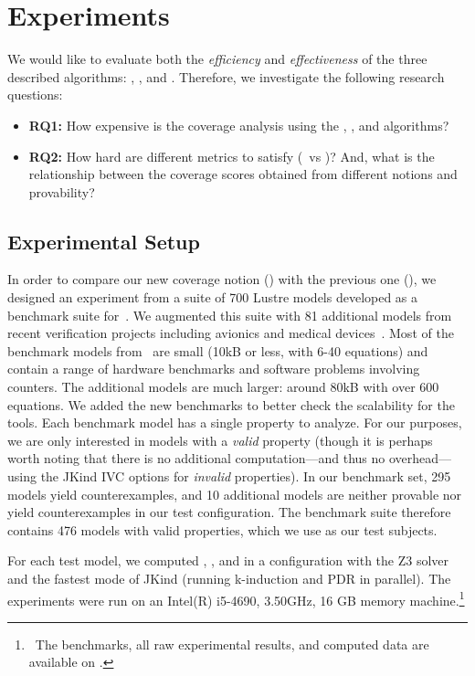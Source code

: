 \section{Experiments}
\label{sec:experiments}

We would like to evaluate both the {\em efficiency} and {\em
  effectiveness} of the three described algorithms: \ucbfalg, \ucalg, and \mustalg. Therefore, we investigate the following research questions:
\begin{itemize}
    \item \textbf{RQ1:} How expensive is the coverage analysis using the \ucalg, \mustalg, and \ucbfalg algorithms?
    \item \textbf{RQ2:} How hard are different metrics to satisfy (\ivccov\ vs \nondetcovalt)?  And, what is the relationship between the coverage scores obtained from different notions and provability?
\end{itemize}

\subsection{Experimental Setup}

In order to compare our new coverage notion (\ivccov) with the previous one (\nondetcovalt), we designed an experiment from a suite of 700 Lustre models developed
as a benchmark suite for~\cite{Hagen08:FMCAD}. We augmented this suite
with 81 additional models from recent verification projects including
avionics and medical devices~\cite{QFCS15:backes,hilt2013}. Most of
the benchmark models from~\cite{Hagen08:FMCAD} are small (10kB or less,
with 6-40 equations) and contain a range of hardware benchmarks and
software problems involving counters. The additional models are much
larger: around 80kB with over 600 equations. We added the new
benchmarks to better check the scalability for the tools. Each benchmark model has a single property to analyze.  For our purposes, we are only interested in models with a {\em valid} property (though it is perhaps worth noting that there is no additional computation---and thus no overhead---using the JKind IVC options for {\em invalid} properties).  In our benchmark set, 295 models yield counterexamples, and 10 additional models are neither provable nor yield counterexamples in our test configuration.  The benchmark suite therefore contains 476 models with valid properties, which we use as our test subjects.

For each test model, we computed \ucalg, \ucbfalg, and \mustalg in a configuration with
the Z3 solver and the fastest mode of JKind (running k-induction and PDR in parallel). The experiments
were run on an  Intel(R) i5-4690, 3.50GHz,
16 GB memory machine.\footnote{\noindent ~The benchmarks, all raw experimental results,
  and computed data are available on \cite{expr}.}





